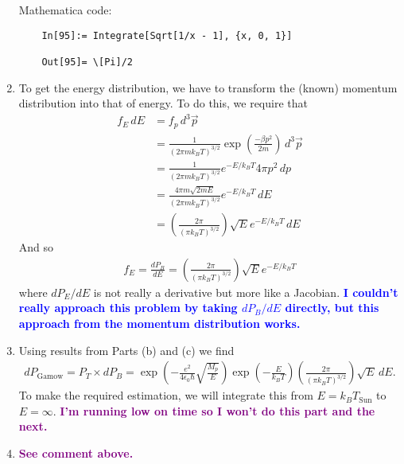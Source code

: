 \documentclass{article}
\theoremstyle{definition}
\newcommand{\be}{\beta}
\newcommand{\f}[2]{\frac{#1}{#2}}
\newcommand{\lp}{\left(}
\newcommand{\rp}{\right)}
\begin{document}
\begin{enumerate}[label=(\alph*)]
	
	
	Mathematica code:
	\begin{lstlisting}
	In[95]:= Integrate[Sqrt[1/x - 1], {x, 0, 1}]
	
	Out[95]= \[Pi]/2
	\end{lstlisting}
	
	
	
	\item To get the energy distribution, we have to transform the (known) momentum distribution into that of energy. To do this, we require that
	\begin{align*}
	f_E\,dE &= f_p \,d^3\vec{p}\\
	&= \f{1}{(2\pi m k_B T)^{3/2}}\exp\lp \f{-\be p^2}{2m} \rp \,d^3\vec{p}\\
	&= \f{1}{(2\pi m k_B T)^{3/2}}e^{-E/k_B  T} 4\pi   p^2 \, dp \\
	&= \f{4\pi m\sqrt{2mE}}{(2\pi m k_B T)^{3/2}} e^{-E/k_B T}\,dE \\
	&= \lp \f{2\pi}{(\pi k_B T)^{3/2}}\rp \sqrt{E} e^{-E/k_BT}\,dE
	\end{align*}
	And so 
	\begin{align*}
	\boxed{f_E = \f{d P_B}{ d E} = \lp \f{2\pi}{(\pi k_B T)^{3/2}}\rp \sqrt{E} e^{-E/k_BT}}
	\end{align*}
	where $d P_E / dE$ is not really a derivative but more like a Jacobian. \textbf{\textcolor{blue}{I couldn't really approach this problem by taking $d P_B/dE$ directly, but this approach from the momentum distribution works. }}
	
	
	
	\item Using results from Parts (b) and (c) we find 
	\begin{align*}
	dP_\text{Gamow} = P_T \times dP_B = \exp\lp - \f{e^2}{4\epsilon_0 \hbar} \sqrt{\f{M_p}{E}}\rp  \exp\lp -\f{E}{k_BT}\rp \lp \f{2\pi}{(\pi k_B T)^{3/2}}\rp \sqrt{E} \,dE.
	\end{align*}
	To make the required estimation, we will integrate this from $E=k_BT_\text{Sun}$ to $E=\infty$.  \textbf{\textcolor{purple}{I'm running low on time so I won't do this part and the next.}}
	
	\item \textbf{\textcolor{purple}{See comment above.}}
\end{enumerate}	

	
	
\end{document}
